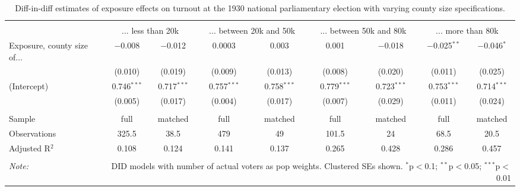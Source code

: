 
\begin{table}[!htbp] \centering 
  \caption{Diff-in-diff estimates of exposure effects on turnout at the 1930 national parliamentary election with varying county size specifications.\vspace{-.25cm}} 
  \label{tab:nsdap-turnout-countysize-dd-1930} 
\scriptsize 
\begin{tabular}{@{\extracolsep{5pt}}lcccccccc} 
\\[-1.8ex]\hline 
\hline \\[-1.8ex] 
 & \multicolumn{2}{c}{... less than 20k } & \multicolumn{2}{c}{... between 20k and 50k} & \multicolumn{2}{c}{... between 50k and 80k} & \multicolumn{2}{c}{... more than 80k} \\ 
 \cmidrule(r){2-3}\cmidrule(r){4-5}\cmidrule(r){6-7}\cmidrule(r){8-9}Exposure, county size of... & $-$0.008 & $-$0.012 & 0.0003 & 0.003 & 0.001 & $-$0.018 & $-$0.025$^{**}$ & $-$0.046$^{*}$ \\ 
  & (0.010) & (0.019) & (0.009) & (0.013) & (0.008) & (0.020) & (0.011) & (0.025) \\ 
  (Intercept) & 0.746$^{***}$ & 0.717$^{***}$ & 0.757$^{***}$ & 0.758$^{***}$ & 0.779$^{***}$ & 0.723$^{***}$ & 0.753$^{***}$ & 0.714$^{***}$ \\ 
  & (0.005) & (0.017) & (0.004) & (0.017) & (0.007) & (0.029) & (0.011) & (0.024) \\ 
 \hline \\[-1.8ex] 
Sample & full & matched & full & matched & full & matched & full & matched \\ 
Observations & 325.5 & 38.5 & 479 & 49 & 101.5 & 24 & 68.5 & 20.5 \\ 
Adjusted R$^{2}$ & 0.108 & 0.124 & 0.141 & 0.137 & 0.265 & 0.428 & 0.286 & 0.457 \\ 
\hline 
\hline \\[-1.8ex] 
\textit{Note:}  & \multicolumn{8}{r}{DID models with number of actual voters as pop weights. Clustered SEs shown. $^{*}$p$<$0.1; $^{**}$p$<$0.05; $^{***}$p$<$0.01} \\ 
\end{tabular} 
\end{table} 
